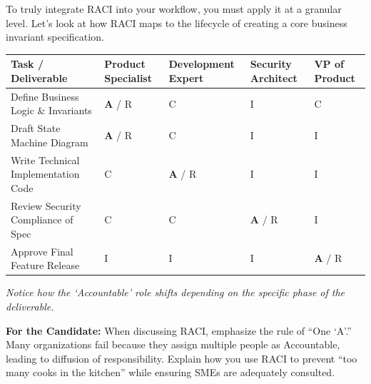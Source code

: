 \documentclass[
  11pt,
  openany,
  oneside]{book}
\renewenvironment{quote}{\begin{customquote}}{\end{customquote}}
\begin{document}
To truly integrate RACI into your workflow, you must apply it at a
granular level. Let's look at how RACI maps to the lifecycle of creating
a core business invariant specification.

\begin{longtable}[]{@{}
  >{\raggedright\arraybackslash}p{}
  >{\centering\arraybackslash}p{}
  >{\centering\arraybackslash}p{}
  >{\centering\arraybackslash}p{}
  >{\centering\arraybackslash}p{}@{}}
\toprule\noalign{}
\begin{minipage}[b]{\linewidth}\raggedright
Task / Deliverable
\end{minipage} & \begin{minipage}[b]{\linewidth}\centering
Product Specialist
\end{minipage} & \begin{minipage}[b]{\linewidth}\centering
Development Expert
\end{minipage} & \begin{minipage}[b]{\linewidth}\centering
Security Architect
\end{minipage} & \begin{minipage}[b]{\linewidth}\centering
VP of Product
\end{minipage} \\
\midrule\noalign{}
\endhead
\bottomrule\noalign{}
\endlastfoot
Define Business Logic \& Invariants & \textbf{A} / R & C & I & C \\
Draft State Machine Diagram & \textbf{A} / R & C & I & I \\
Write Technical Implementation Code & C & \textbf{A} / R & I & I \\
Review Security Compliance of Spec & C & C & \textbf{A} / R & I \\
Approve Final Feature Release & I & I & I & \textbf{A} / R \\
\end{longtable}

\emph{Notice how the `Accountable' role shifts depending on the specific
phase of the deliverable.}

\begin{quote}
\textbf{For the Candidate:} When discussing RACI, emphasize the rule of
``One `A'.'' Many organizations fail because they assign multiple people
as Accountable, leading to diffusion of responsibility. Explain how you
use RACI to prevent ``too many cooks in the kitchen'' while ensuring
SMEs are adequately consulted.
\end{quote}
\end{document}
